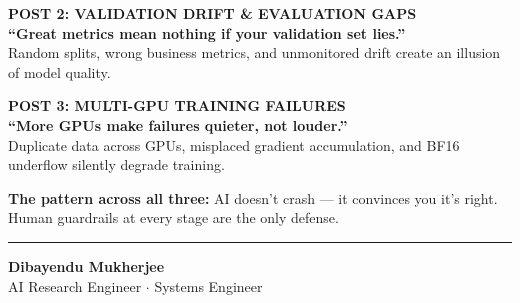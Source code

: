 \documentclass[11pt]{article}
\begin{document}
\vspace{0.08in}

\begin{darkbox}[top=8pt, bottom=8pt]
{\small\color{brandblue}\textbf{POST 2: VALIDATION DRIFT \& EVALUATION GAPS}} \\
{\normalsize\textbf{``Great metrics mean nothing if your validation set lies.''}} \\
{\footnotesize\color{brandlight!80}Random splits, wrong business metrics, and unmonitored drift create an illusion of model quality.}
\end{darkbox}

\vspace{0.08in}

\begin{darkbox}[top=8pt, bottom=8pt]
{\small\color{brandblue}\textbf{POST 3: MULTI-GPU TRAINING FAILURES}} \\
{\normalsize\textbf{``More GPUs make failures quieter, not louder.''}} \\
{\footnotesize\color{brandlight!80}Duplicate data across GPUs, misplaced gradient accumulation, and BF16 underflow silently degrade training.}
\end{darkbox}

\vspace{0.12in}

\begin{center}
{\fontsize{11}{13}\selectfont\color{brandgray}
\textbf{The pattern across all three:} AI doesn't crash — it convinces you it's right.\\
Human guardrails at every stage are the only defense.
}
\end{center}

\vfill

\begin{center}
\rule{0.6\textwidth}{0.5pt}

\vspace{0.08in}

{\fontsize{12}{14}\selectfont\color{brandnavy}\textbf{Dibayendu Mukherjee}} \\
{\fontsize{9}{11}\selectfont\color{brandgray}AI Research Engineer \quad $\cdot$ \quad Systems Engineer}
\end{center}

\newpage


\thispagestyle{empty}
\vspace*{0.8in}
\end{document}
